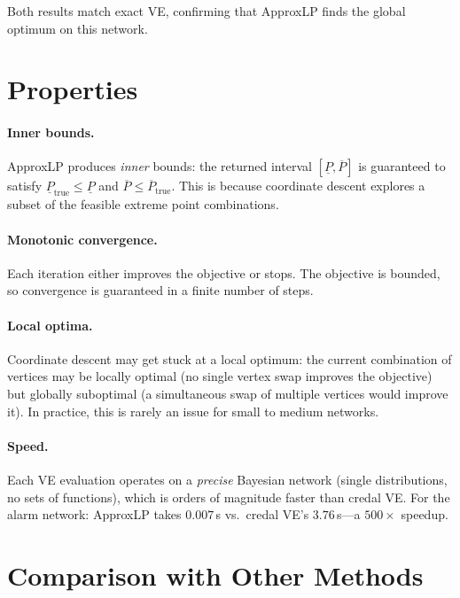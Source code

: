 \documentclass[11pt]{article}
\begin{document}
Both results match exact VE, confirming that ApproxLP finds the global optimum on this network.

\section{Properties}

\paragraph{Inner bounds.}
ApproxLP produces \emph{inner} bounds: the returned interval $[\underline{P}, \overline{P}]$
is guaranteed to satisfy $\underline{P}_{\mathrm{true}} \leq \underline{P}$ and
$\overline{P} \leq \overline{P}_{\mathrm{true}}$. This is because coordinate descent
explores a subset of the feasible extreme point combinations.

\paragraph{Monotonic convergence.}
Each iteration either improves the objective or stops. The objective is bounded, so
convergence is guaranteed in a finite number of steps.

\paragraph{Local optima.}
Coordinate descent may get stuck at a local optimum: the current combination of vertices
may be locally optimal (no single vertex swap improves the objective) but globally
suboptimal (a simultaneous swap of multiple vertices would improve it). In practice,
this is rarely an issue for small to medium networks.

\paragraph{Speed.}
Each VE evaluation operates on a \emph{precise} Bayesian network (single distributions,
no sets of functions), which is orders of magnitude faster than credal VE. For the alarm
network: ApproxLP takes $0.007$\,s vs.\ credal VE's $3.76$\,s---a $500\times$ speedup.

\section{Comparison with Other Methods}
\end{document}
